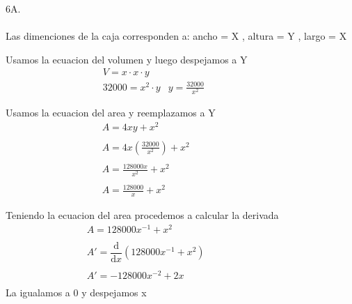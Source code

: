 \documentclass{report}
\begin{document}
{\Large\justify  6A.\\\\ Las dimenciones de la caja corresponden a: ancho  = X , altura = Y , largo = X }

\vspace{1cm}


\vspace{1cm}
{\Large

    Usamos la ecuacion del volumen y luego despejamos a Y
    \begin{align*}
         & V = x \cdot x \cdot y &  &  &  &  &  &  &  &  & \\
         & 32000 = x^2 \cdot y
         & y = \frac{32000}{x^2}
    \end{align*}

    Usamos la ecuacion del area y reemplazamos a Y
    \begin{align*}
         & A = 4x y + x^2                                  &  &  &  &  &  &  &  &  &  & \\\\
         & A = 4x \left(    \frac{32000}{x^2}\right) + x^2                              \\\\
         & A = \frac{128000 x}{ x^2 }+ x^2                                              \\\\
         & A = \frac{128000 }{ x }+ x^2
    \end{align*}

    Teniendo la ecuacion del area procedemos a calcular la derivada
    \begin{align*}
         & A = 128000x^{-1} + x^2                                               &  &  &  &  &  &  &  &  &  & \\\\
         & A' =\dfrac {\mathrm{d} }{\mathrm{d} x}\left(128000x^{-1} +x^2\right)                              \\\\
         & A' = -128000x^{-2} + 2x                                                                           \\
    \end{align*}
    La igualamos a 0 y despejamos  x

}
\end{document}
